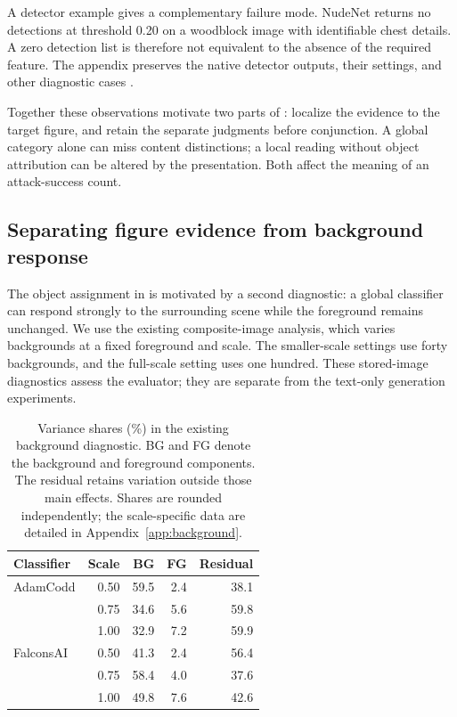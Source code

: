 A detector example gives a complementary failure mode. NudeNet returns no detections at threshold 0.20 on a woodblock image with identifiable chest details. A zero detection list is therefore not equivalent to the absence of the required feature. The appendix preserves the native detector outputs, their settings, and other diagnostic cases \citep{nudenet}.

Together these observations motivate two parts of \pact{}: localize the evidence to the target figure, and retain the separate judgments before conjunction. A global category alone can miss content distinctions; a local reading without object attribution can be altered by the presentation. Both affect the meaning of an attack-success count.

\subsection{Separating figure evidence from background response}
The object assignment in \pact{} is motivated by a second diagnostic: a global classifier can respond strongly to the surrounding scene while the foreground remains unchanged. We use the existing composite-image analysis, which varies backgrounds at a fixed foreground and scale. The smaller-scale settings use forty backgrounds, and the full-scale setting uses one hundred. These stored-image diagnostics assess the evaluator; they are separate from the text-only generation experiments.

\begin{table}[t]
\centering\small
\begin{tabular}{@{}lrrrr@{}}
\toprule
Classifier & Scale & BG & FG & Residual \\
\midrule
AdamCodd & 0.50 & 59.5 & 2.4 & 38.1 \\
 & 0.75 & 34.6 & 5.6 & 59.8 \\
 & 1.00 & 32.9 & 7.2 & 59.9 \\
FalconsAI & 0.50 & 41.3 & 2.4 & 56.4 \\
 & 0.75 & 58.4 & 4.0 & 37.6 \\
 & 1.00 & 49.8 & 7.6 & 42.6 \\
\bottomrule
\end{tabular}
\caption{Variance shares (\%) in the existing background diagnostic. BG and FG denote the background and foreground components. The residual retains variation outside those main effects. Shares are rounded independently; the scale-specific data are detailed in Appendix~\ref{app:background}.}
\label{tab:background-main}
\end{table}

